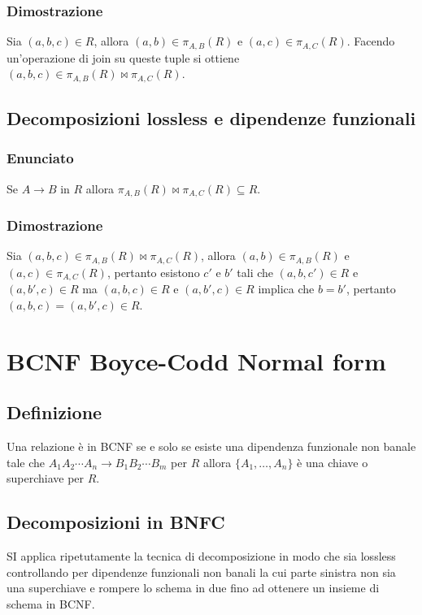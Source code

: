 \subsubsection{Dimostrazione}
Sia $(a, b, c)\in R$, allora $(a, b)\in \pi_{A,B}(R)$ e $(a, c)\in \pi_{A,C}(R)$. Facendo un'operazione di join su queste tuple si ottiene $(a, b, c)\in \pi_{A,B}(R)\bowtie\pi_{A,C}(R)$. 
\subsection{Decomposizioni lossless e dipendenze funzionali}
\subsubsection{Enunciato}
Se $A\rightarrow B$ in $R$ allora $\pi_{A,B}(R)\bowtie\pi_{A,C}(R)\subseteq R$.
\subsubsection{Dimostrazione}
Sia $(a, b, c)\in \pi_{A,B}(R)\bowtie\pi_{A,C}(R)$, allora $(a, b)\in \pi_{A, B}(R)$ e $(a, c)\in \pi_{A, C}(R)$, pertanto esistono $c'$ e $b'$ tali che $(a, b, c')\in R$ e $(a, b', c)\in R$ ma $(a, b, c)\in R$ e $(a, b', c)\in R$
implica che $b=b'$, pertanto $(a, b, c)=(a, b', c)\in R$. 
\section{BCNF Boyce-Codd Normal form}
\subsection{Definizione}
Una relazione \`e in BCNF se e solo se esiste una dipendenza funzionale non banale tale che $A_1A_2\cdots A_n\rightarrow B_1B_2\cdots B_m$ per $R$ allora $\{A_1, \dots, A_n\}$ \`e una chiave o superchiave
per $R$.
\subsection{Decomposizioni in BNFC}
SI applica ripetutamente la tecnica di decomposizione in modo che sia lossless controllando per dipendenze funzionali non banali la cui parte sinistra non sia una superchiave e rompere lo schema in due fino ad
ottenere un insieme di schema in BCNF.
